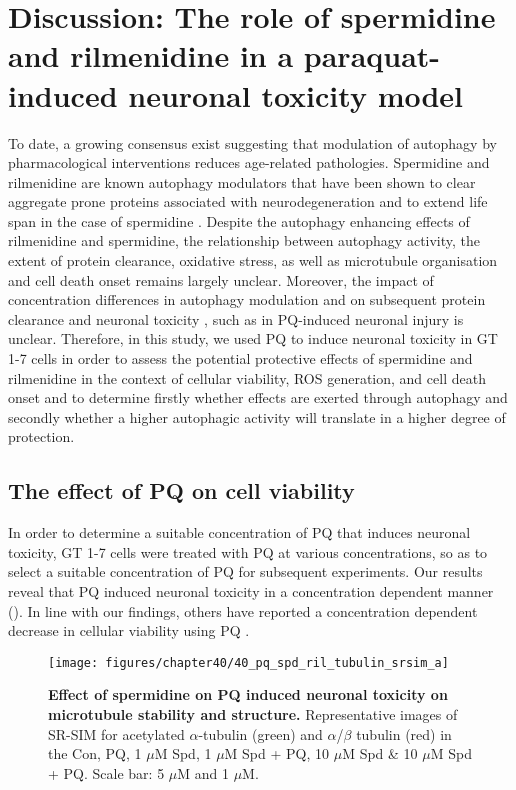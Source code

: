 \section{Discussion: The role of spermidine and rilmenidine in a paraquat-induced neuronal toxicity model}
To date, a growing consensus exist suggesting that modulation of autophagy by pharmacological interventions reduces age-related pathologies. Spermidine and rilmenidine are known autophagy modulators that have been shown to clear aggregate prone proteins associated with neurodegeneration \citep{Bhukel2017,Buttner2014,Rose2010,Sigrist2014} and to extend life span in the case of spermidine \citep{Madeo2010,Morselli2009}. Despite the autophagy enhancing effects of rilmenidine and spermidine, the relationship between autophagy activity, the extent of protein clearance, oxidative stress, as well as microtubule organisation and cell death onset remains largely unclear. Moreover, the impact of concentration differences in autophagy modulation and on subsequent protein clearance and neuronal toxicity , such as in PQ-induced neuronal injury is unclear. Therefore, in this study, we used PQ to induce neuronal toxicity in GT 1-7 cells in order to assess the potential protective effects of spermidine and rilmenidine in the context of cellular viability, ROS generation, and cell death onset and to determine firstly whether effects are exerted through autophagy and secondly whether a higher autophagic activity will translate in a higher degree of protection. 

\subsection{ The effect of PQ on cell viability}
In order to determine a suitable concentration of PQ that induces neuronal toxicity, GT 1-7 cells were treated with PQ at various concentrations, so as to select a suitable concentration of PQ for subsequent experiments. Our results reveal that PQ induced neuronal toxicity in a concentration dependent manner (). In line with our findings, others have reported a concentration dependent decrease in cellular viability using PQ \citep{Chen2012b,Jaroonwitchawan2017,Mehdi2013}. 

\begin{landscape}\centering
\begin{figure}[!htbp]
\vspace*{\fill}
\centering
  \texttt{[image: figures/chapter40/40\_pq\_spd\_ril\_tubulin\_srsim\_a]}
  \caption[Effect of spermidine on PQ induced neuronal toxicity on microtubule stability and structure]{\textbf{Effect of spermidine on PQ induced neuronal toxicity on microtubule stability and structure.} Representative images of SR-SIM for acetylated $\alpha$-tubulin (green) and $\alpha$/$\beta$ tubulin (red) in the Con, PQ, 1 $\mu$M Spd, 1 $\mu$M Spd + PQ, 10 $\mu$M Spd \& 10 $\mu$M Spd + PQ. Scale bar: 5 $\mu$M and 1 $\mu$M.}
  \label{fig:40_pq_spd_ril_tubulin_srsim_a}
\end{figure} 
\vfill
\end{landscape}

